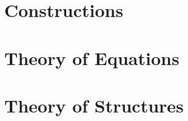 \documentclass{book}
\newcounter{t}
\theoremstyle{definition}
\begin{document}
\frontmatter



\tableofcontents

\setcounter{chapter}{-1}

\mainmatter



\part{Constructions}






\part{Theory of Equations}




\part{Theory of Structures}


\backmatter



\end{document}
